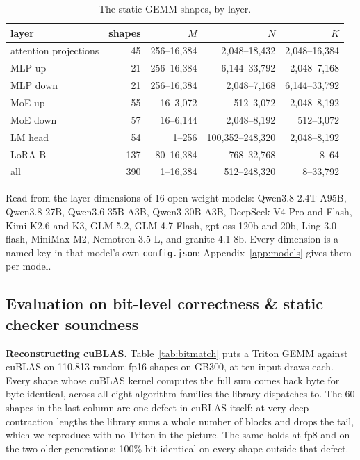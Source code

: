 \documentclass[sigplan,nonacm]{acmart}
\begin{document}
\begin{table}[!ht]
  \centering
  \caption{The static GEMM shapes, by layer.}
  \label{tab:shapes}
  \footnotesize
  \setlength{\tabcolsep}{2pt}
  \begin{tabular}{lrrrr}
    \toprule
    layer                  & shapes & $M$ & $N$ & $K$ \\
    \midrule
    attention projections  &  45 &   256--16,384 &   2,048--18,432 &  2,048--16,384 \\
    MLP up                 &  21 &   256--16,384 &   6,144--33,792 &   2,048--7,168 \\
    MLP down               &  21 &   256--16,384 &    2,048--7,168 &  6,144--33,792 \\
    MoE up                 &  55 &     16--3,072 &      512--3,072 &   2,048--8,192 \\
    MoE down               &  57 &     16--6,144 &    2,048--8,192 &     512--3,072 \\
    LM head                &  54 &        1--256 & 100,352--248,320 &  2,048--8,192 \\
    LoRA B                 & 137 &    80--16,384 &   768--32,768 &          8--64 \\
    \midrule
    all                    & 390 &     1--16,384 &  512--248,320 &        8--33,792 \\
    \bottomrule
  \end{tabular}

  \vspace{2pt}
  \parbox{\columnwidth}{\footnotesize Read from the layer dimensions of 16 open-weight
  models: Qwen3.8-2.4T-A95B, Qwen3.8-27B, Qwen3.6-35B-A3B, Qwen3-30B-A3B, DeepSeek-V4
  Pro and Flash, Kimi-K2.6 and K3, GLM-5.2, GLM-4.7-Flash, gpt-oss-120b and 20b,
  Ling-3.0-flash, MiniMax-M2, Nemotron-3.5-L, and granite-4.1-8b. Every dimension is a
  named key in that model's own \texttt{config.json};
  Appendix~\ref{app:models} gives them per model.}
\end{table}

\subsection{Evaluation on bit-level correctness \& static checker soundness}
\label{sec:eval-correctness}

\textbf{Reconstructing cuBLAS.} Table~\ref{tab:bitmatch} puts a Triton GEMM
against cuBLAS on 110,813 random fp16 shapes on GB300, at ten input draws each.
Every shape whose cuBLAS kernel computes the full sum comes back byte for byte
identical, across all eight algorithm families the library dispatches to. The
60 shapes in the last column are one defect in cuBLAS itself: at very deep contraction lengths the
library sums a whole number of blocks and drops the tail, which we reproduce
with no Triton in the picture. The same holds at fp8 and on the two
older generations: 100\% bit-identical on every shape outside that defect.
\end{document}
